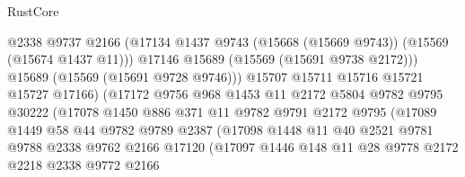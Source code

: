 \begin{lexlean}{RustCore}
\begin{coremodule}
                                @2338
                                @9737
                                @2166
                                (@17134
                                  @1437
                                  @9743
                                  (@15668 (@15669 @9743))
                                  (@15569 (@15674 @1437 @11)))
                                @17146
                                @15689
                                (@15569 (@15691 @9738 @2172)))
                              @15689
                              (@15569 (@15691 @9728 @9746)))
                            @15707
                            @15711
                            @15716
                            @15721
                            @15727
                            @17166)
                          (@17172
                            @9756
                            @968
                            @1453
                            @11
                            @2172
                            @5804
                            @9782
                            @9795
                            @30222
                            (@17078
                              @1450
                              @886
                              @371
                              @11
                              @9782
                              @9791
                              @2172
                              @9795
                              (@17089
                                @1449
                                @58
                                @44
                                @9782
                                @9789
                                @2387
                                (@17098
                                  @1448
                                  @11
                                  @40
                                  @2521
                                  @9781
                                  @9788
                                  @2338
                                  @9762
                                  @2166
                                  @17120
                                  (@17097
                                    @1446
                                    @148
                                    @11
                                    @28
                                    @9778
                                    @2172
                                    @2218
                                    @2338
                                    @9772
                                    @2166

\end{coremodule}
\end{lexlean}
